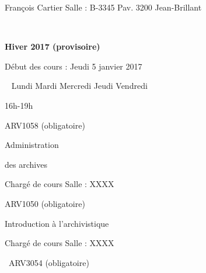 \documentclass [12 pt]{article}
\begin{document}
                                François Cartier
                                Salle : B-3345
                                Pav. 3200 Jean-Brillant
                            
                             
                        
                    
                
            
            
        \textbf{
        Hiver 2017 (provisoire)
        }
    
            Début des cours : Jeudi 5 janvier 2017
            
                
                    
                        
                             
                            Lundi
                            Mardi
                            Mercredi
                            Jeudi
                            Vendredi
                        
                        
                            
                                16h-19h
                            
                            
                                
                                    ARV1058 (obligatoire)
                                
                                
                                    Administration 
                                
                                
                                    des archives
                                
                                Chargé de cours
                                Salle : XXXX
                            
                            
                                
                                    ARV1050 (obligatoire)
                                
                                
                                    Introduction à 
                                    l'archivistique
                                
                                Chargé de cours
                                Salle : XXXX
                            
                            
                                 ARV3054
                                            (obligatoire)
                                
\end{document}
